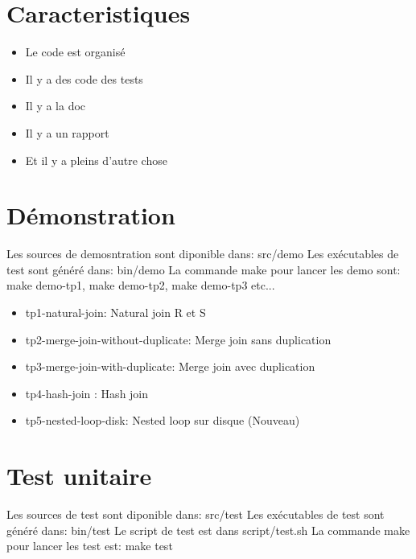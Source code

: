 \documentclass[a4paper]{article}
\begin{document}
\section{Caracteristiques}

\begin{itemize}
	\item Le code est organisé
	\item Il y a des code des tests
	\item Il y a la doc
	\item Il y a un rapport
	\item Et il y a pleins d'autre chose
\end{itemize}

\section{Démonstration}

Les sources de demosntration sont diponible dans: src/demo
Les exécutables de test sont généré dans: bin/demo
La commande make pour lancer les demo sont: make demo-tp1, make demo-tp2, make demo-tp3 etc...

\begin{itemize}
  \item tp1-natural-join: Natural join R et S
  \item tp2-merge-join-without-duplicate: Merge join sans duplication
  \item tp3-merge-join-with-duplicate: Merge join avec duplication
  \item tp4-hash-join : Hash join
  \item tp5-nested-loop-disk: Nested loop sur disque  (Nouveau)
\end{itemize}

\section{Test unitaire}

Les sources de test sont diponible dans: src/test
Les exécutables de test sont généré dans: bin/test
Le script de test est dans script/test.sh
La commande make pour lancer les test est: make test
\end{document}
